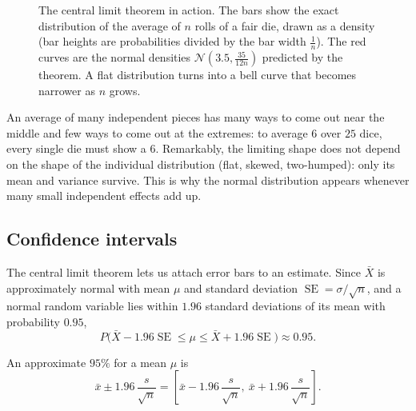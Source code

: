 \begin{figure}[htbp]
\caption{The central limit theorem in action. The bars show the exact
  distribution of the average of $n$ rolls of a fair die, drawn as a density
  (bar heights are probabilities divided by the bar width $\frac1n$). The red
  curves are the normal densities $\mathcal{N}(3.5, \frac{35}{12n})$ predicted by
  the theorem. A flat distribution turns into a bell curve that becomes narrower
  as $n$ grows.}
\label{fig:clt}
\end{figure}

\begin{intuition}
An average of many independent pieces has many ways to come out near the middle
and few ways to come out at the extremes: to average $6$ over $25$ dice, every
single die must show a $6$. Remarkably, the limiting shape does not depend on the
shape of the individual distribution (flat, skewed, two-humped): only its mean
and variance survive. This is why the normal distribution appears whenever many
small independent effects add up.
\end{intuition}

\subsection{Confidence intervals}

The central limit theorem lets us attach error bars to an estimate. Since
$\bar X$ is approximately normal with mean $\mu$ and standard deviation
$\operatorname{SE} = \sigma/\sqrt n$, and a normal random variable lies within
$1.96$ standard deviations of its mean with probability $0.95$,
\[
  P\bigl(\bar X - 1.96\operatorname{SE} \le \mu \le \bar X + 1.96\operatorname{SE}\bigr)
  \approx 0.95 .
\]

\begin{definition}\label{def:confidence-interval}
An approximate $95\%$  for a mean $\mu$ is
\[
  \bar x \pm 1.96\,\frac{s}{\sqrt n}
  = \left[\bar x - 1.96\,\frac{s}{\sqrt n},\ \bar x + 1.96\,\frac{s}{\sqrt n}\right].
\]
\end{definition}

